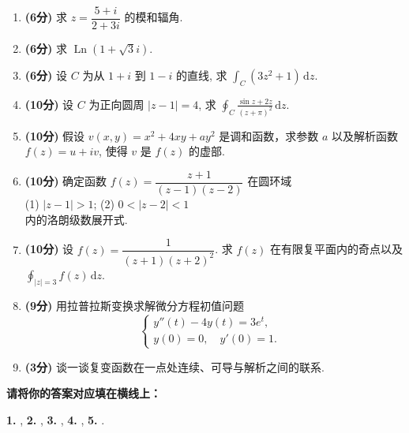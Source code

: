 \documentclass[simple]{hfutexam}
\DeclareMathOperator{\Ln}{Ln}
\newcommand{\diff}{\,\mathrm{d}}
\begin{document}
\begin{enumerate}
\item \textbf{(6分)} 求 $z=\dfrac{5+i}{2+3i}$ 的模和辐角.
\item \textbf{(6分)} 求 $\Ln(1+\sqrt3i)$.
\item \textbf{(6分)} 设 $C$ 为从 $1+i$ 到 $1-i$ 的直线, 求 $\displaystyle\int_C (3z^2+1) \diff z$.
\item \textbf{(10分)} 设 $C$ 为正向圆周 $|z-1|=4$, 求 $\displaystyle\oint_C\frac{\sin z+2z}{(z+\pi)^2}\diff z$.
\item \textbf{(10分)} 假设 $v(x,y)=x^2+4xy+ay^2$ 是调和函数，求参数 $a$ 以及解析函数 $f(z)=u+iv$, 使得 $v$ 是 $f(z)$ 的虚部.
\item \textbf{(10分)} 确定函数 $f(z)=\dfrac{z+1}{(z-1)(z-2)}$ 在圆环域\\
\indent (1) $|z-1|>1$; \hspace{2em} (2) $0<|z-2|<1$\\
内的洛朗级数展开式.
\item \textbf{(10分)} 设 $f(z)=\dfrac{1}{(z+1)(z+2)^2}$. 求 $f(z)$ 在有限复平面内的奇点以及 $\displaystyle\oint_{|z|=3}f(z)\diff z$.
\item \textbf{(9分)} 用拉普拉斯变换求解微分方程初值问题
\[\begin{cases}
y''(t)-4y(t)=3e^t,&\\
y(0)=0,\quad y'(0)=1.
\end{cases}\]
\item \textbf{(3分)} 谈一谈复变函数在一点处连续、可导与解析之间的联系.
\end{enumerate}


\newpage
{}
\ZhuanYeBanJi{}
\maketitle


\textbf{请将你的答案对应填在横线上：}

\textbf{1.} , 
\textbf{2.} , 
\textbf{3.} , 
\textbf{4.} , 
\textbf{5.} .
\end{document}
